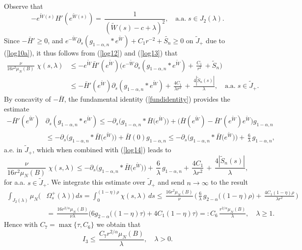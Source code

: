 \documentclass[10pt]{article}
\begin{document}
Observe that
\[ -e^{\tilde{W}(s)} H'(e^{\tilde{W}(s)})=\,\frac{1}{(\tilde{W}(s)-c+\lambda)^2
},\quad \mbox{a.a.}\;s\in J_2(\lambda).\]
Since $-\bar{H}'\ge 0$,
and $e^{-\tilde{W}}
\partial_s(g_{1-\alpha,n}\ast
e^{\tilde{W}})+C_1 r^{-2}+\tilde{S_n}\ge 0$ on $\tilde{J}_+$ due
to (\ref{log10a}), it thus follows from (\ref{log12}) and
(\ref{log13}) that
\begin{align} \label{log14}
\frac{\nu}{16r^2 \mu_N(B)}\,\,\chi(s,\lambda) & \le
-e^{\tilde{W}}\bar{H}'(e^{\tilde{W}})\Big(e^{-\tilde{W}}\partial_s(g_{1-\alpha,n}\ast
e^{\tilde{W}})+\,\frac{C_1}{r^2}\,+\tilde{S}_n\Big)\nonumber\\
& \le -\bar{H}'(e^{\tilde{W}})\partial_s(g_{1-\alpha,n}\ast
e^{\tilde{W}})+\,\frac{4C_1}{\lambda
r^2}\,+\,\frac{4|\tilde{S}_n(s)|}{\lambda}, \quad\mbox{a.a.}\;
s\in \tilde{J}_+.
\end{align}
By concavity of $-\bar{H}$, the fundamental identity
(\ref{fundidentity}) provides the estimate
\begin{align*}
-\bar{H}'(e^{\tilde{W}}) & \partial_s(g_{1-\alpha,n}\ast
e^{\tilde{W}})  \le -\partial_s\Big(g_{1-\alpha,n}\ast
\bar{H}\big(e^{\tilde{W}}\big)\Big)+\Big(\bar{H}(e^{\tilde{W}})-
\bar{H}'(e^{\tilde{W}})e^{\tilde{W}}\Big)g_{1-\alpha,n} \\
& \le -\partial_s\Big(g_{1-\alpha,n}\ast
\bar{H}\big(e^{\tilde{W}}\big)\Big)+\bar{H}(0)g_{1-\alpha,n} \le
-\partial_s\Big(g_{1-\alpha,n}\ast
\bar{H}\big(e^{\tilde{W}}\big)\Big)
+\,\frac{6}{\lambda}\,g_{1-\alpha,n},
\end{align*}
a.e. in $\tilde{J}_+$, which when combined with (\ref{log14})
leads to
\[
\frac{\nu}{16r^2 \mu_N(B)}\,\,\chi(s,\lambda) \le
-\partial_s\Big(g_{1-\alpha,n}\ast
\bar{H}\big(e^{\tilde{W}}\big)\Big)
+\,\frac{6}{\lambda}\,g_{1-\alpha,n}+\,\frac{4C_1}{\lambda
r^2}\,+\,\frac{4|\tilde{S}_n(s)|}{\lambda},
\]
for a.a. $s\in \tilde{J}_+$. We integrate this estimate over
$\tilde{J}_+$ and send $n\to \infty$ to the result
\begin{align*}
\int_{J_2(\lambda)}\mu_N\big(  & \Omega^+_s(\lambda)\big) \,ds
  = \int_0^{(1-\eta)\rho} \!\!\!\!\chi(s,\lambda)\,ds\le
  \,\frac{16r^2\mu_N(B)}{\nu}\,\Big(\,\frac{6}{\lambda}\,g_{2-\alpha}\big((1-\eta)\rho\big)+\,\frac{4C_1(1-\eta)\rho}{\lambda
  r^2}\,\Big)\\
  &
  =\,\frac{16r^{2/\alpha}\mu_N(B)}{\nu\lambda}\big(6g_{2-\alpha}\big((1-\eta)\tau\big)+4C_1(1-\eta)\tau\big)=:C_6\,
  \frac{r^{2/\alpha}\mu_N(B)}{\lambda},\quad \lambda\ge 1.
\end{align*}
Hence with $C_7=\max\{\tau,C_6\}$ we obtain that
\begin{equation} \label{I3est}
I_3\le \,\frac{C_7 r^{2/\alpha}\mu_N(B)}{\lambda},\quad\lambda>0.
\end{equation}
\end{document}
